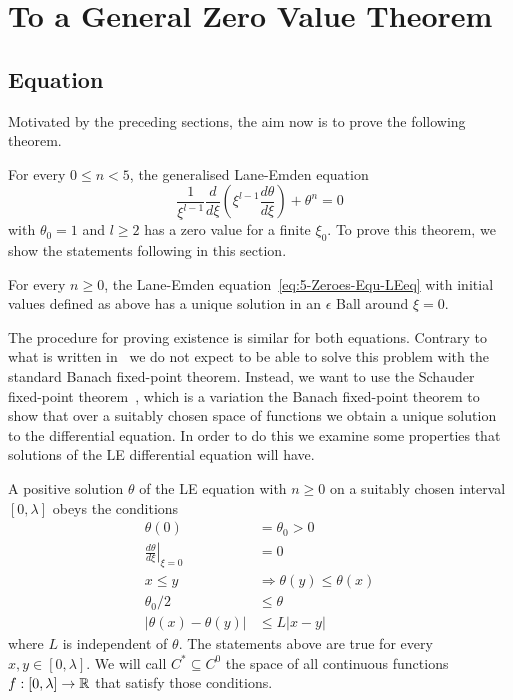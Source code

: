 \section{To a General Zero Value Theorem}
\label{sec:5-zeroes}
\subsection{\texorpdfstring{}{LE} Equation}
\label{subsec:5-zeroes-le-equation}
Motivated by the preceding sections, the aim now is to prove the following theorem.
\begin{theorem}
	\label{5-Zeroes-Theo-Lane-EmdenFiniteBoundary}
	For every $0\leq n<5$, the generalised Lane-Emden equation
	\begin{equation}
		\frac{1}{\xi^{l-1}}\frac{d}{d\xi}\left(\xi^{l-1}\frac{d\theta}{d\xi}\right)+\theta^n=0
		\label{eq:5-Zeroes-Equ-LEeq}
	\end{equation}
	with $\theta_0=1$ and $l\geq2$ has a zero value for a finite $\xi_0$.
	To prove this theorem, we show the statements following in this section.
\end{theorem}
\begin{lemma}
	\label{5-Zeroes-Lem-Lane-Emden-Local-Existence}
	For every $n\geq0$, the Lane-Emden equation~\ref{eq:5-Zeroes-Equ-LEeq} with initial values defined as above has a unique solution in an $\epsilon$ Ball around $\xi=0$.
\end{lemma}\noindent
The procedure for proving existence is similar for both equations.
Contrary to what is written in~\cite[p.~50]{quittnerSuperlinearParabolicProblems2007} we do not expect to be able to solve this problem with the standard Banach fixed-point theorem.
Instead, we want to use the Schauder fixed-point theorem~\cite{schauderFixpunktsatzFunktionalraumen1930}, which is a variation the Banach fixed-point theorem to show that over a suitably chosen space of functions we obtain a unique solution to the differential equation.
In order to do this we examine some properties that solutions of the \ac{LE} differential equation will have.
\begin{lemma}
	\label{5-Zeroes-Lem-LE-Conditions}
	A positive solution $\theta$ of the \ac{LE} equation with $n\geq0$ on a suitably chosen interval $[0,\lambda]$ obeys the conditions
	\begin{align}
		\theta(0) 					&= \theta_0>0\label{5-Zeroes-Equ-LE-Conditions-Initial-1}\\
		\left.\frac{d\theta}{d\xi}\right|_{\xi=0} &= 0 \label{5-Zeroes-Equ-LE-Conditions-Initial-2}\\
		x\leq y 					&\Rightarrow \theta(y)\leq\theta(x)\label{5-Zeroes-Equ-LE-Conditions-3}\\
		\theta_0/2					&\leq \theta \label{5-Zeroes-Equ-LE-Conditions-4}\\
		|\theta(x)-\theta(y)|		&\leq L|x-y|\label{5-Zeroes-Equ-LE-Conditions-5}
	\end{align}
	where $L$ is independent of $\theta$.
	The statements above are true for every $x,y\in[0,\lambda]$.
	We will call $C^*\subseteq C^0$ the space of all continuous functions $f:[0,\lambda]\rightarrow\mathbb{R}$ that satisfy those conditions.
\end{lemma}
